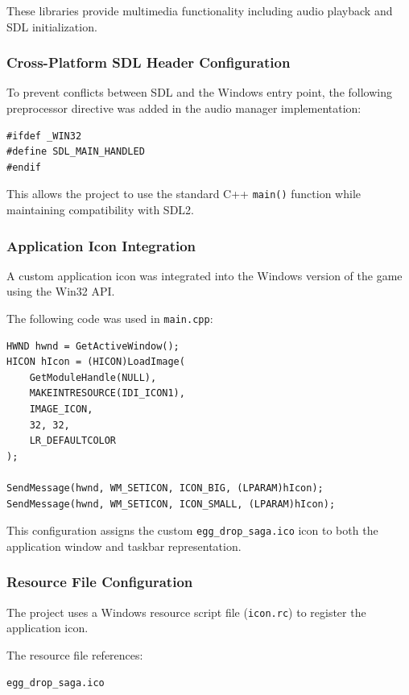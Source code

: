 \documentclass[12pt,a4paper]{report}
\begin{document}
These libraries provide multimedia functionality including audio playback and SDL initialization.

\subsubsection*{Cross-Platform SDL Header Configuration}

To prevent conflicts between SDL and the Windows entry point, the following preprocessor directive was added in the audio manager implementation:

\begin{verbatim}
#ifdef _WIN32
#define SDL_MAIN_HANDLED
#endif
\end{verbatim}

This allows the project to use the standard C++ \texttt{main()} function while maintaining compatibility with SDL2.

\subsubsection*{Application Icon Integration}

A custom application icon was integrated into the Windows version of the game using the Win32 API.

The following code was used in \texttt{main.cpp}:

\begin{verbatim}
HWND hwnd = GetActiveWindow();
HICON hIcon = (HICON)LoadImage(
    GetModuleHandle(NULL),
    MAKEINTRESOURCE(IDI_ICON1),
    IMAGE_ICON,
    32, 32,
    LR_DEFAULTCOLOR
);

SendMessage(hwnd, WM_SETICON, ICON_BIG, (LPARAM)hIcon);
SendMessage(hwnd, WM_SETICON, ICON_SMALL, (LPARAM)hIcon);
\end{verbatim}

This configuration assigns the custom \texttt{egg\_drop\_saga.ico} icon to both the application window and taskbar representation.

\subsubsection*{Resource File Configuration}

The project uses a Windows resource script file (\texttt{icon.rc}) to register the application icon.

The resource file references:

\begin{verbatim}
egg_drop_saga.ico
\end{verbatim}
\end{document}
